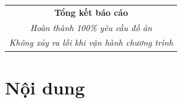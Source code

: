 \documentclass[a4paper,12pt]{report}
\begin{document}
\begin{center}
\begin{tabular}{|c|p{}|c|}
    \multicolumn{3}{|c|}{\textbf{Tổng kết báo cáo}}                                                                                                                                      \\
    \multicolumn{3}{|c|}{\textsl{Hoàn thành 100\% yêu cầu đồ án}}                                                                                                                        \\
    \multicolumn{3}{|c|}{\textsl{Không xảy ra lỗi khi vận hành chương trình}}                                                                                                            \\\hline
  \end{tabular}
\end{center}

\pagebreak
\section{Nội dung}
\end{document}

